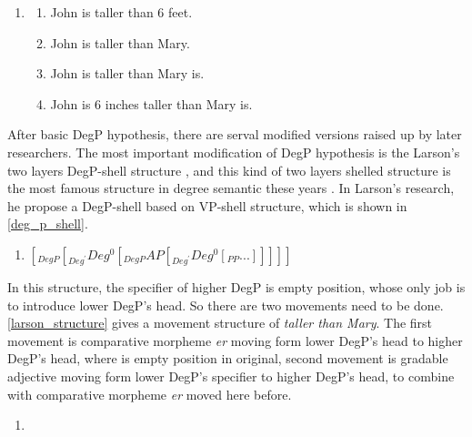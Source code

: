 \documentclass{ctexart}
\let \cite \parencite
\begin{document}
\begin{enumerate}
    \item \label{er_var_example}
    \begin{enumerate}
        \item \label{er_var_1} John is taller than 6 feet.
        \item \label{er_var_2} John is taller than Mary.
        \item \label{er_var_3} John is taller than Mary is.
        \item \label{er_var_4} John is 6 inches taller than Mary is.
    \end{enumerate}

\end{enumerate}

After basic DegP hypothesis, there are serval modified versions raised up by later researchers. The most important modification of DegP hypothesis is the Larson's two layers DegP-shell structure \cite{larson1991}, and this kind of two layers shelled structure is the most famous structure in degree semantic these years \cite{grano2012,guo2012,xiang2005,fabregas2020}. In Larson's research, he propose a DegP-shell based on VP-shell structure, which is shown in \ref{deg_p_shell}. 

\begin{enumerate}
    \item \label{deg_p_shell} $[_{DegP} [_{Deg^{\prime}} Deg^0 [_{DegP} AP [_{Deg^{\prime}} Deg^0 [_{PP}...]]]]] $
\end{enumerate}

In this structure, the specifier of higher DegP is empty position, whose only job is to introduce lower DegP's head. So there are two movements need to be done. \ref{larson_structure} gives a movement structure of \textit{taller than Mary}. The first movement is comparative morpheme \textit{er} moving form lower DegP's head to higher DegP's head, where is empty position in original, second movement is gradable adjective moving form lower DegP's specifier to higher DegP's head, to combine with comparative morpheme \textit{er} moved here before.

\begin{enumerate}
    \item \label{larson_structure}
\end{enumerate}
\end{document}
